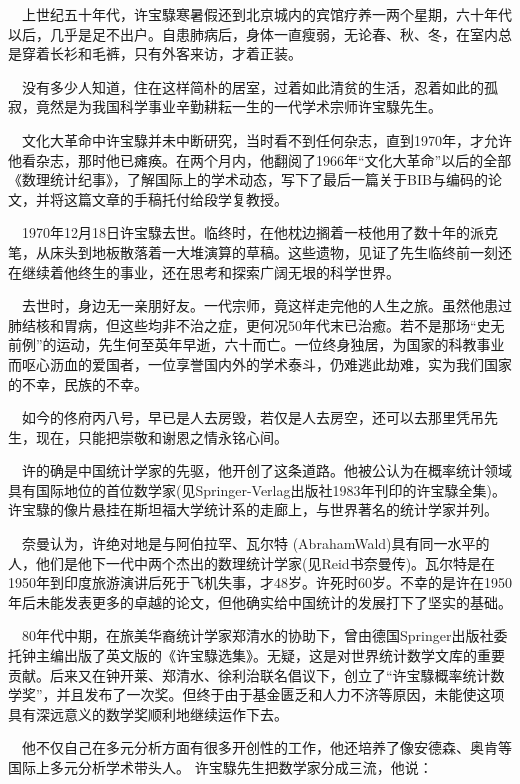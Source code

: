 $\quad$上世纪五十年代，许宝騄寒暑假还到北京城内的宾馆疗养一两个星期，六十年代以后，几乎是足不出户。自患肺病后，身体一直瘦弱，无论春、秋、冬，在室内总是穿着长衫和毛裤，只有外客来访，才着正装。

$\quad$没有多少人知道，住在这样简朴的居室，过着如此清贫的生活，忍着如此的孤寂，竟然是为我国科学事业辛勤耕耘一生的一代学术宗师许宝騄先生。

$\quad$文化大革命中许宝騄并未中断研究，当时看不到任何杂志，直到1970年，才允许他看杂志，那时他已瘫痪。在两个月内，他翻阅了1966年“文化大革命”以后的全部《数理统计纪事》，了解国际上的学术动态，写下了最后一篇关于BIB与编码的论文，并将这篇文章的手稿托付给段学复教授。

$\quad$1970年12月18日许宝騄去世。临终时，在他枕边搁着一枝他用了数十年的派克笔，从床头到地板散落着一大堆演算的草稿。这些遗物，见证了先生临终前一刻还在继续着他终生的事业，还在思考和探索广阔无垠的科学世界。

$\quad$去世时，身边无一亲朋好友。一代宗师，竟这样走完他的人生之旅。虽然他患过肺结核和胃病，但这些均非不治之症，更何况50年代末已治癒。若不是那场“史无前例”的运动，先生何至英年早逝，六十而亡。一位终身独居，为国家的科教事业而呕心沥血的爱国者，一位享誉国内外的学术泰斗，仍难逃此劫难，实为我们国家的不幸，民族的不幸。

$\quad$如今的佟府丙八号，早已是人去房毁，若仅是人去房空，还可以去那里凭吊先生，现在，只能把崇敬和谢恩之情永铭心间。

$\quad$许的确是中国统计学家的先驱，他开创了这条道路。他被公认为在概率统计领域具有国际地位的首位数学家(见Springer-Verlag出版社1983年刊印的许宝騄全集)。许宝騄的像片悬挂在斯坦福大学统计系的走廊上，与世界著名的统计学家并列。

$\quad$奈曼认为，许绝对地是与阿伯拉罕、瓦尔特 (AbrahamWald)具有同一水平的人，他们是他下一代中两个杰出的数理统计学家(见Reid书奈曼传)。瓦尔特是在1950年到印度旅游演讲后死于飞机失事，才48岁。许死时60岁。不幸的是许在1950年后未能发表更多的卓越的论文，但他确实给中国统计的发展打下了坚实的基础。

$\quad$80年代中期，在旅美华裔统计学家郑清水的协助下，曾由德国Springer出版社委托钟主编出版了英文版的《许宝騄选集》。无疑，这是对世界统计数学文库的重要贡献。后来又在钟开莱、郑清水、徐利治联名倡议下，创立了“许宝騄概率统计数学奖”，并且发布了一次奖。但终于由于基金匮乏和人力不济等原因，未能使这项具有深远意义的数学奖顺利地继续运作下去。 

$\quad$他不仅自己在多元分析方面有很多开创性的工作，他还培养了像安德森、奥肯等国际上多元分析学术带头人。
许宝騄先生把数学家分成三流，他说：

